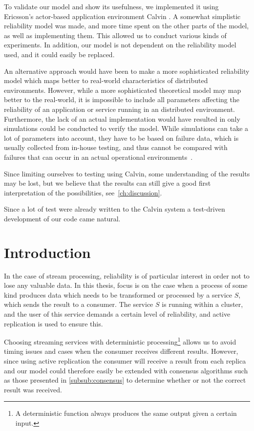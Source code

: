 \documentclass{cslthse-msc}
\begin{document}
To validate our model and show its usefulness, we implemented it using Ericsson's actor-based application environment Calvin \cite{calvin}. A somewhat simplistic reliability model was made, and more time spent on the other parts of the model, as well as implementing them. This allowed us to conduct various kinds of experiments. In addition, our model is not dependent on the reliability model used, and it could easily be replaced.

An alternative approach would have been to make a more sophisticated reliability model which maps better to real-world characteristics of distributed environments. However, while a more sophisticated theoretical model may map better to the real-world, it is impossible to include all parameters affecting the reliability of an application or service running in an distributed environment. Furthermore, the lack of an actual implementation would have resulted in only simulations could be conducted to verify the model. While simulations can take a lot of parameters into account, they have to be based on failure data, which is usually collected from in-house testing, and thus cannot be compared with failures that can occur in an actual operational environments~\cite{surveyReliabilityDistr}.

Since limiting ourselves to testing using Calvin, some understanding of the results may be lost, but we believe that the results can still give a good first interpretation of the possibilities, see~\cref{ch:discussion}. 

Since a lot of test were already written to the Calvin system a test-driven development of our code came natural.

\section{Introduction} \label{sec:design_intro}
In the case of stream processing, reliability is of particular interest in order not to lose any valuable data. In this thesis, focus is on the case when a process of some kind produces data which needs to be transformed or processed by a service $S$, which sends the result to a consumer. The service $S$ is running within a cluster, and the user of this service demands a certain level of reliability, and active replication is used to ensure this.	

Choosing streaming services with deterministic processing\footnote{A deterministic function always produces the same output given a certain input.} allows us to avoid timing issues and cases when the consumer receives different results. However, since using active replication the consumer will receive a result from each replica and our model could therefore easily be extended with consensus algorithms such as those presented in \cref{subsub:consensus} to determine whether or not the correct result was received. 
\end{document}
